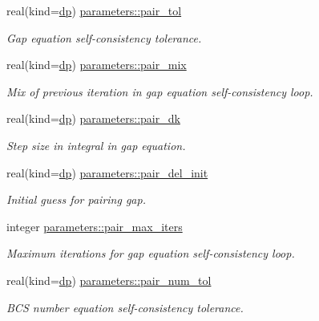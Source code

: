 \begin{DoxyCompactItemize}
real(kind=\mbox{\hyperlink{namespaceparameters_a52f8c6351fd79345d8811e065bcbbb37}{dp}}) \mbox{\hyperlink{group__INPUT__PARS_ga9b9d6d0cf64fa6e7f9dd00f5b15848bd}{parameters\+::pair\+\_\+tol}}
\begin{DoxyCompactList}\small\item\em Gap equation self-\/consistency tolerance. \end{DoxyCompactList}\item 
real(kind=\mbox{\hyperlink{namespaceparameters_a52f8c6351fd79345d8811e065bcbbb37}{dp}}) \mbox{\hyperlink{group__INPUT__PARS_ga6fdafa171f65aa7236a9c76ebaab4d08}{parameters\+::pair\+\_\+mix}}
\begin{DoxyCompactList}\small\item\em Mix of previous iteration in gap equation self-\/consistency loop. \end{DoxyCompactList}\item 
real(kind=\mbox{\hyperlink{namespaceparameters_a52f8c6351fd79345d8811e065bcbbb37}{dp}}) \mbox{\hyperlink{group__INPUT__PARS_ga1c083bc7a4e3979327020ec3e1509220}{parameters\+::pair\+\_\+dk}}
\begin{DoxyCompactList}\small\item\em Step size in integral in gap equation. \end{DoxyCompactList}\item 
real(kind=\mbox{\hyperlink{namespaceparameters_a52f8c6351fd79345d8811e065bcbbb37}{dp}}) \mbox{\hyperlink{group__INPUT__PARS_ga9fe26afec63d3ebfb7900ccc330779d0}{parameters\+::pair\+\_\+del\+\_\+init}}
\begin{DoxyCompactList}\small\item\em Initial guess for pairing gap. \end{DoxyCompactList}\item 
integer \mbox{\hyperlink{group__INPUT__PARS_gafef003bd348d08faadb13f56378b8e4c}{parameters\+::pair\+\_\+max\+\_\+iters}}
\begin{DoxyCompactList}\small\item\em Maximum iterations for gap equation self-\/consistency loop. \end{DoxyCompactList}\item 
real(kind=\mbox{\hyperlink{namespaceparameters_a52f8c6351fd79345d8811e065bcbbb37}{dp}}) \mbox{\hyperlink{group__INPUT__PARS_gad39a7f1795d33065b388d6966d51e190}{parameters\+::pair\+\_\+num\+\_\+tol}}
\begin{DoxyCompactList}\small\item\em B\+CS number equation self-\/consistency tolerance. \end{DoxyCompactList}\end{DoxyCompactItemize}


